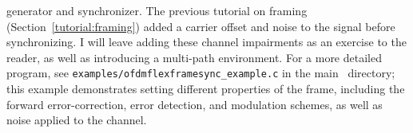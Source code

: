 generator and synchronizer.
The previous tutorial on framing (Section~\ref{tutorial:framing}) added
a carrier offset and noise to the signal before synchronizing.
I will leave adding these channel impairments as an exercise to the
reader, as well as introducing a multi-path environment.
%
For a more detailed program, see {\tt examples/ofdmflexframesync\_example.c}
in the main \liquid\ directory;
this example demonstrates setting different properties of the frame,
including the forward error-correction, error detection, and modulation
schemes,
as well as noise applied to the channel.
%
%

%
%

